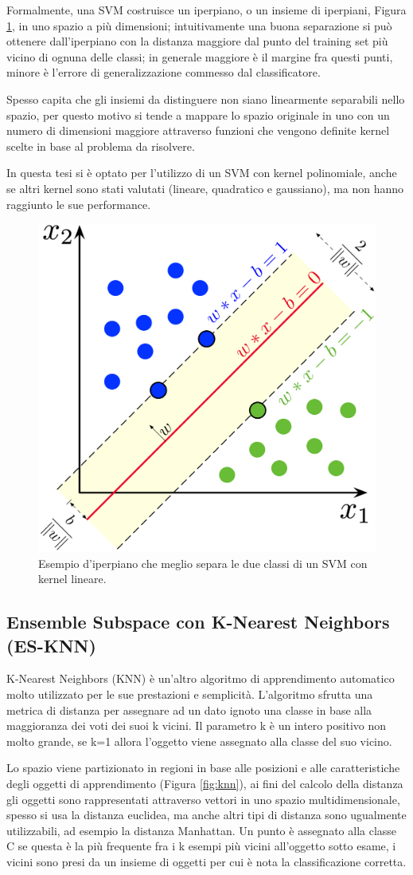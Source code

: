 Formalmente, una SVM costruisce un iperpiano, o un insieme di iperpiani, Figura \ref{fig:svm}, in uno spazio a più dimensioni; intuitivamente una buona separazione si può ottenere dall'iperpiano con la distanza maggiore dal punto del training set più vicino di ognuna delle classi; in generale maggiore è il margine fra questi punti, minore è l'errore di generalizzazione commesso dal classificatore. 

Spesso capita che gli insiemi da distinguere non siano linearmente separabili nello spazio, per questo motivo si tende a mappare lo spazio originale in uno con un numero di dimensioni maggiore attraverso funzioni che vengono definite kernel scelte in base al problema da risolvere.

In questa tesi si è optato per l'utilizzo di un SVM con kernel polinomiale, anche se altri kernel sono stati valutati (lineare, quadratico e gaussiano), ma non hanno raggiunto le sue performance.

\begin{figure}[!htb]
    \centering
    \includegraphics[width=.4\textwidth]{figure/svm.png}
    \caption{Esempio d'iperpiano che meglio separa le due classi di un SVM con kernel lineare.}
    \label{fig:svm}
\end{figure}

\subsection{Ensemble Subspace con K-Nearest Neighbors (ES-KNN)}
\label{ssec:knn}

K-Nearest Neighbors (KNN) è un'altro algoritmo di apprendimento automatico molto utilizzato per le sue prestazioni e semplicità. L'algoritmo sfrutta una metrica di distanza per assegnare ad un dato ignoto una classe in base alla maggioranza dei voti dei suoi k vicini. Il parametro k è un intero positivo non molto grande, se k=1 allora l'oggetto viene assegnato alla classe del suo vicino. 

Lo spazio viene partizionato in regioni in base alle posizioni e alle caratteristiche degli oggetti di apprendimento (Figura \ref{fig:knn}), ai fini del calcolo della distanza gli oggetti sono rappresentati attraverso vettori in uno spazio multidimensionale, spesso si usa la distanza euclidea, ma anche altri tipi di distanza sono ugualmente utilizzabili, ad esempio la distanza Manhattan. 
Un punto è assegnato alla classe C se questa è la più frequente fra i k esempi più vicini all'oggetto sotto esame, i vicini sono presi da un insieme di oggetti per cui è nota la classificazione corretta. 

